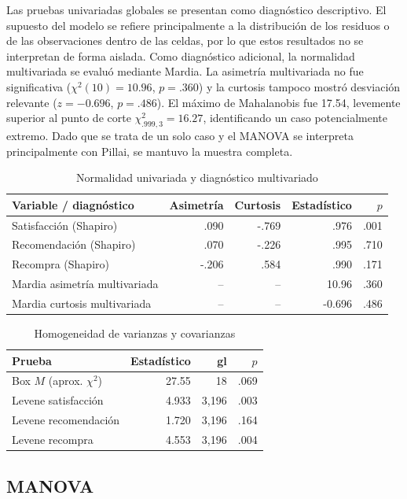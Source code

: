 \documentclass[12pt,letterpaper]{article}
\begin{document}
Las pruebas univariadas globales se presentan como diagnóstico descriptivo. El supuesto del modelo se refiere principalmente a la distribución de los residuos o de las observaciones dentro de las celdas, por lo que estos resultados no se interpretan de forma aislada. Como diagnóstico adicional, la normalidad multivariada se evaluó mediante Mardia. La asimetría multivariada no fue significativa ($\chi^2(10)=10.96$, $p=.360$) y la curtosis tampoco mostró desviación relevante ($z=-0.696$, $p=.486$). El máximo de Mahalanobis fue 17.54, levemente superior al punto de corte $\chi^2_{.999,3}=16.27$, identificando un caso potencialmente extremo. Dado que se trata de un solo caso y el MANOVA se interpreta principalmente con Pillai, se mantuvo la muestra completa.


\begin{table}[H]
\centering
\caption{Normalidad univariada y diagnóstico multivariado}
\label{tab:p4-normalidad}
\begin{tabular}{lrrrr}
\toprule
Variable / diagnóstico & Asimetría & Curtosis & Estadístico & $p$ \\
\midrule
Satisfacción (Shapiro) & .090 & -.769 & .976 & .001 \\
Recomendación (Shapiro) & .070 & -.226 & .995 & .710 \\
Recompra (Shapiro) & -.206 & .584 & .990 & .171 \\
Mardia asimetría multivariada & -- & -- & 10.96 & .360 \\
Mardia curtosis multivariada & -- & -- & -0.696 & .486 \\
\bottomrule
\end{tabular}
\end{table}

\begin{table}[H]
\centering
\caption{Homogeneidad de varianzas y covarianzas}
\label{tab:p4-homogeneidad}
\begin{tabular}{lrrr}
\toprule
Prueba & Estadístico & gl & $p$ \\
\midrule
Box $M$ (aprox. $\chi^2$) & 27.55 & 18 & .069 \\
Levene satisfacción & 4.933 & 3,196 & .003 \\
Levene recomendación & 1.720 & 3,196 & .164 \\
Levene recompra & 4.553 & 3,196 & .004 \\
\bottomrule
\end{tabular}
\end{table}

\subsection{MANOVA}
\end{document}
